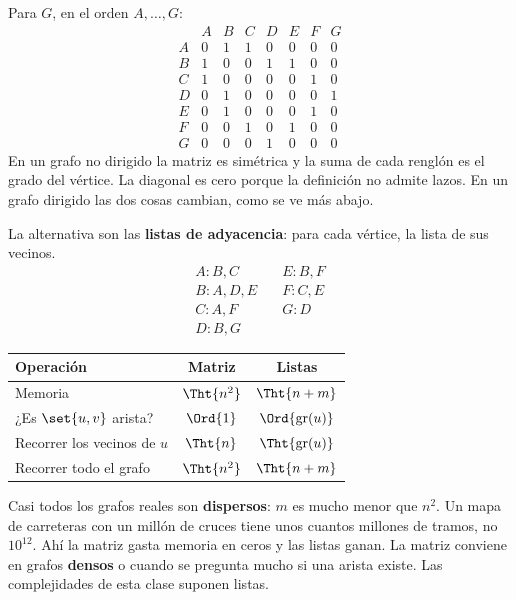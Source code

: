 \documentclass[11pt,letterpaper]{article}
\begin{document}
Para $G$, en el orden $A, \dots, G$:
\[
  \begin{array}{c|ccccccc}
      & A & B & C & D & E & F & G \\ \hline
    A & 0 & 1 & 1 & 0 & 0 & 0 & 0 \\
    B & 1 & 0 & 0 & 1 & 1 & 0 & 0 \\
    C & 1 & 0 & 0 & 0 & 0 & 1 & 0 \\
    D & 0 & 1 & 0 & 0 & 0 & 0 & 1 \\
    E & 0 & 1 & 0 & 0 & 0 & 1 & 0 \\
    F & 0 & 0 & 1 & 0 & 1 & 0 & 0 \\
    G & 0 & 0 & 0 & 1 & 0 & 0 & 0
  \end{array}
\]
En un grafo no dirigido la matriz es simétrica y la suma de cada
renglón es el grado del vértice. La diagonal es cero porque la
definición no admite lazos. En un grafo dirigido las dos cosas cambian,
como se ve más abajo.

La alternativa son las \textbf{listas de adyacencia}: para cada vértice,
la lista de sus vecinos.
\[
  \begin{array}{ll}
    A: B, C & \quad E: B, F \\
    B: A, D, E & \quad F: C, E \\
    C: A, F & \quad G: D \\
    D: B, G &
  \end{array}
\]

\begin{center}
\small
\begin{tabular}{lcc}
  \toprule
  \textbf{Operación} & \textbf{Matriz} & \textbf{Listas} \\
  \midrule
  Memoria & $\Tht{n^2}$ & $\Tht{n + m}$ \\
  ¿Es $\set{u, v}$ arista? & $\Ord{1}$ & $\Ord{\text{gr}(u)}$ \\
  Recorrer los vecinos de $u$ & $\Tht{n}$ & $\Tht{\text{gr}(u)}$ \\
  Recorrer todo el grafo & $\Tht{n^2}$ & $\Tht{n + m}$ \\
  \bottomrule
\end{tabular}
\end{center}

\begin{idea}
  Casi todos los grafos reales son \textbf{dispersos}: $m$ es mucho
  menor que $n^2$. Un mapa de carreteras con un millón de cruces tiene
  unos cuantos millones de tramos, no $10^{12}$. Ahí la matriz gasta
  memoria en ceros y las listas ganan. La matriz conviene en grafos
  \textbf{densos} o cuando se pregunta mucho si una arista existe.
  Las complejidades de esta clase suponen listas.
\end{idea}
\end{document}
